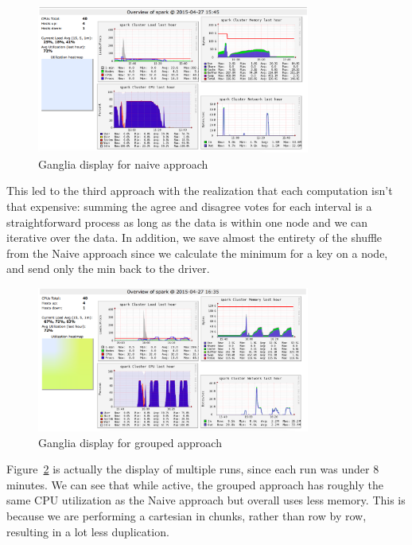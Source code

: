 \documentclass[11pt]{article}
\begin{document}
\begin{figure}[h!]
\centering
\includegraphics[width=0.8\textwidth]{ganglia_naive}
\caption{Ganglia display for naive approach}
\label{fig:ganglia-naive}
\end{figure}


This led to the third approach with the realization that each computation isn't that expensive: summing the agree and disagree votes for each interval is a straightforward process as long as the data is within one node and we can iterative over the data. In addition, we save almost the entirety of the shuffle from the Naive approach since we calculate the minimum for a key on a node, and send only the min back to the driver. 

\begin{figure}[h!]
\centering
\includegraphics[width=0.8\textwidth]{ganglia_grouped}
\caption{Ganglia display for grouped approach}
\label{fig:ganglia-grouped}
\end{figure}

Figure~\ref{fig:ganglia-grouped} is actually the display of multiple runs, since each run was under 8 minutes. We can see that while active, the grouped approach has roughly the same CPU utilization as the Naive approach but overall uses less memory. This is because we are performing a cartesian in chunks, rather than row by row, resulting in a lot less duplication. 
\end{document}
